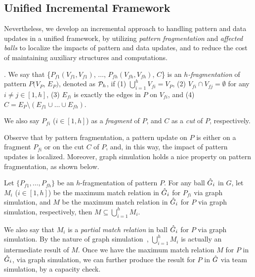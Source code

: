 \subsection{Unified Incremental Framework}
\label{subsec-framework}

Nevertheless, we develop an incremental approach to handling pattern and data updates in a unified framework, by utilizing {\em pattern fragmentation} and {\em affected balls} to localize the impacts of pattern and data updates, and to reduce the cost of maintaining auxiliary structures and computations.


.
We say that \{$P_{f1}(V_{f1},V_{f1})$, $\ldots$, $P_{fh}(V_{fh},V_{fh})$, $C$\} is an {\em $h$-fragmentation} of pattern $P(V_{P}$, $E_{P})$, denoted as ${\cal P}_{h}$,
if (1) $\bigcup_{i=1}^{h}V_{fi}=V_{P}$, (2) $V_{fi}\cap V_{fj} = \emptyset$ for any $i\ne j\in[1, h]$,
(3) $E_{fi}$ is exactly the edges in $P$ on $V_{fi}$, and (4) $C=E_P \setminus (E_{f1}\cup\ldots\cup E_{fh})$.

We also say $P_{fi}$ ($i\in[1,h]$) as a {\em fragment} of $P$, and $C$ as a {\em cut} of $P$, respectively.

Observe that by pattern fragmentation, a pattern update on $P$ is either on a fragment $P_{fi}$ or on the cut $C$ of $P$, and, in this way, the impact of pattern updates is localized. Moreover, graph simulation holds a nice property on pattern fragmentation, as shown below.

\vspace{-0.5ex}
\begin{theorem}
\label{thm-compose}
Let $\{P_{f1},\ldots,P_{fh}\}$ be an $h$-fragmentation of pattern $P$.
For any ball $\hat{G}{}_i$ in $G$, let $M_i$ ($i\in[1,h]$) be the maximum match relation in $\hat{G}{}_i$ for $P_{fi}$ via graph simulation,
and $M$ be the maximum match relation in $\hat{G}{}_i$ for $P$ via graph simulation, respectively,
then $M\subseteq\bigcup_{i=1}^{h}M_{i}$.
\end{theorem}

We also say that $M_i$ is a {\em partial match relation} in ball $\hat{G}{}_i$ for $P$ via graph simulation.
By the nature of graph simulation~\cite{infsimu95}, $\bigcup_{i=1}^{h}M_{i}$ is actually an intermediate result of $M$.
Once we have the maximum match relation $M$ for $P$ in $\hat{G}{}_i$, via graph simulation, we can further produce the result for $P$ in  $\hat{G}{}$ via team simulation, by a capacity check.

